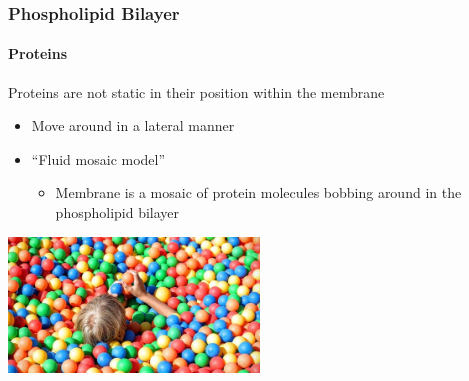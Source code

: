 \documentclass[10pt]{beamer}
\begin{document}
\begin{frame}[t]
\frametitle{Phospholipid Bilayer}
\framesubtitle{Proteins}
\vspace{0.5cm}

	Proteins are not static in their position within the membrane\\
	
	\medskip
	
		\begin{itemize}
			\item Move around in a lateral manner
			\medskip
			\item \textcolor{myblue}{``Fluid mosaic model''}
				\begin{itemize}
					\item Membrane is a mosaic of protein molecules bobbing around in the phospholipid bilayer
				\end{itemize}
		\end{itemize}
	
	\vspace{0.25cm}
	
	\begin{center}
		\includegraphics[width=0.5\textwidth]{figures/ballpit.jpg}
	\end{center}	
\end{frame}
\end{document}
